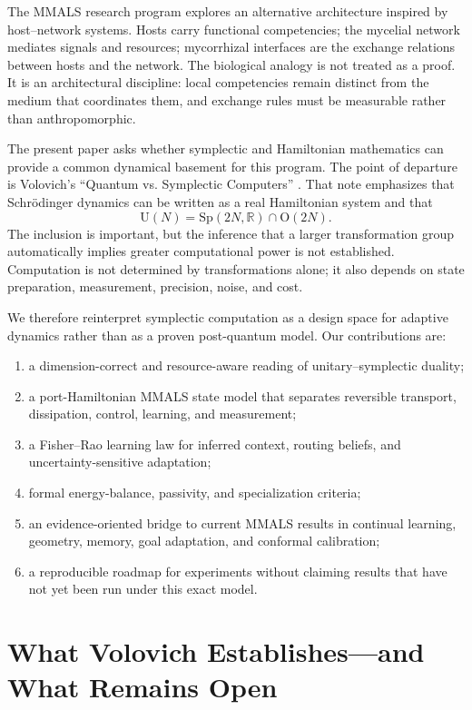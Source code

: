 \documentclass[11pt]{article}
\theoremstyle{definition}\newtheorem{definition}{Definition}\newtheorem{assumption}{Assumption}
\theoremstyle{remark}\newtheorem{remark}{Remark}
\newcommand{\R}{\mathbb{R}}\newcommand{\C}{\mathbb{C}}\newcommand{\E}{\mathbb{E}}
\newcommand{\Sp}{\mathrm{Sp}}\newcommand{\Orth}{\mathrm{O}}\newcommand{\U}{\mathrm{U}}
\begin{document}
The MMALS research program explores an alternative architecture inspired by host--network systems. Hosts carry functional competencies; the mycelial network mediates signals and resources; mycorrhizal interfaces are the exchange relations between hosts and the network. The biological analogy is not treated as a proof. It is an architectural discipline: local competencies remain distinct from the medium that coordinates them, and exchange rules must be measurable rather than anthropomorphic.

The present paper asks whether symplectic and Hamiltonian mathematics can provide a common dynamical basement for this program. The point of departure is Volovich's ``Quantum vs. Symplectic Computers'' \cite{Volovich2024}. That note emphasizes that Schrödinger dynamics can be written as a real Hamiltonian system and that
\begin{equation}
\U(N)=\Sp(2N,\R)\cap \Orth(2N).
\end{equation}
The inclusion is important, but the inference that a larger transformation group automatically implies greater computational power is not established. Computation is not determined by transformations alone; it also depends on state preparation, measurement, precision, noise, and cost.

We therefore reinterpret symplectic computation as a design space for adaptive dynamics rather than as a proven post-quantum model. Our contributions are:
\begin{enumerate}[leftmargin=*]
\item a dimension-correct and resource-aware reading of unitary--symplectic duality;
\item a port-Hamiltonian MMALS state model that separates reversible transport, dissipation, control, learning, and measurement;
\item a Fisher--Rao learning law for inferred context, routing beliefs, and uncertainty-sensitive adaptation;
\item formal energy-balance, passivity, and specialization criteria;
\item an evidence-oriented bridge to current MMALS results in continual learning, geometry, memory, goal adaptation, and conformal calibration;
\item a reproducible roadmap for experiments without claiming results that have not yet been run under this exact model.
\end{enumerate}

\section{What Volovich Establishes---and What Remains Open}
\end{document}
